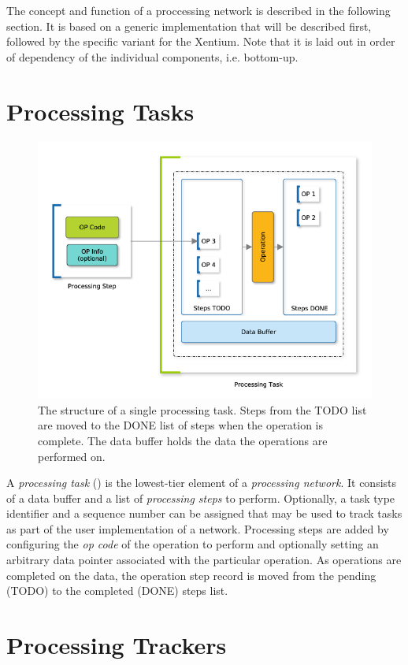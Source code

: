 \noindent The concept and function of a proccessing network is described in the
following section. It is based on a generic implementation that will be
described first, followed by the specific variant for the \gls{Xentium}. Note
that it is laid out in order of dependency of the individual components, i.e.
bottom-up.



\section{Processing Tasks}

\begin{figure}
\begin{center}
	\includegraphics[width=0.7\columnwidth]{images/proc_task}
	\caption{The structure of a single processing task. Steps from the
	TODO list are moved to the DONE list of steps when the
	operation is complete. The data buffer holds the data the operations are
	performed on.}
	\label{fig:proc_task}
\end{center}
\end{figure}

A \emph{processing task} () is the lowest-tier element of a
\emph{processing network}. It consists of a data buffer and a list of
\emph{processing steps} to perform. Optionally, a task type identifier and a
sequence number can be assigned that may be used to track tasks as part of the
user implementation of a network. Processing steps are added by configuring the
\emph{op code} of the operation to perform and optionally setting an arbitrary
data pointer associated with the particular operation. As operations are
completed on the data, the operation step record is moved from the pending
(TODO) to the completed (DONE) steps list.


\section{Processing Trackers}

